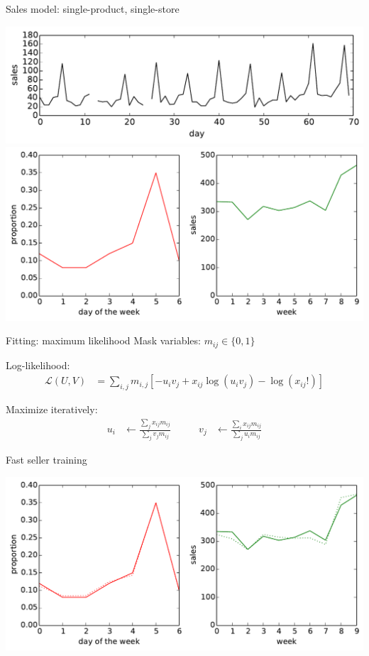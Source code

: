 \documentclass{beamer}
\begin{document}
\begin{frame}{Sales model: single-product, single-store}
 \begin{center}
  \includegraphics[width=0.8\columnwidth]{fast_seller_small.pdf} \\
  \includegraphics[width=0.8\columnwidth]{fast_factorisation.pdf}
 \end{center}
\end{frame}

\begin{frame}{Fitting: maximum likelihood}
 Mask variables: $m_{ij} \in \{0,1\}$
 \vspace{0.5cm}
 
 Log-likelihood:
 \begin{align}
  \mathcal{L}(U,V) &= \sum_{i,j} m_{i,j} \left[ -u_i v_j + x_{ij}\log(u_i v_j) - \log(x_{ij}!) \right]
 \end{align}
 
 Maximize iteratively:
 \begin{align}
  u_i &\leftarrow \frac{\sum_j x_{ij} m_{ij}}{\sum_j v_{j} m_{ij}} & \qquad v_j &\leftarrow \frac{\sum_i x_{ij} m_{ij}}{\sum_j u_{i} m_{ij}}
 \end{align}
\end{frame}

\begin{frame}{Fast seller training}
  \begin{center}
  \includegraphics[width=0.8\columnwidth]{fast_learning.pdf}
 \end{center}
\end{frame}
\end{document}
